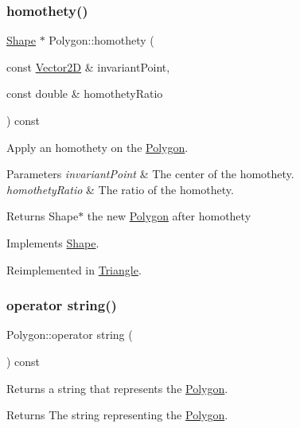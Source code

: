 \subsubsection{\texorpdfstring{homothety()}{homothety()}}
{\footnotesize\ttfamily \hyperlink{class_shape}{Shape} $\ast$ Polygon\+::homothety (\begin{DoxyParamCaption}\item[{const \hyperlink{class_vector2_d}{Vector2D} \&}]{invariant\+Point,  }\item[{const double \&}]{homothety\+Ratio }\end{DoxyParamCaption}) const\hspace{0.3cm}{\ttfamily [virtual]}}

Apply an homothety on the \hyperlink{class_polygon}{Polygon}. 
\begin{DoxyParams}{Parameters}
{\em invariant\+Point} & The center of the homothety. \\
\hline
{\em homothety\+Ratio} & The ratio of the homothety. \\
\hline
\end{DoxyParams}
\begin{DoxyReturn}{Returns}
Shape$\ast$ the new \hyperlink{class_polygon}{Polygon} after homothety 
\end{DoxyReturn}


Implements \hyperlink{class_shape_a91f18af3004ba210db5c91084c50beb9}{Shape}.



Reimplemented in \hyperlink{class_triangle_a45a3a9f74118c99b95c6d8e993773a71}{Triangle}.

\hypertarget{class_polygon_a41c29b75f2463646af0f7bd604a4853d}{}\label{class_polygon_a41c29b75f2463646af0f7bd604a4853d} 
\subsubsection{\texorpdfstring{operator string()}{operator string()}}
{\footnotesize\ttfamily Polygon\+::operator string (\begin{DoxyParamCaption}{ }\end{DoxyParamCaption}) const\hspace{0.3cm}{\ttfamily [virtual]}}

Returns a string that represents the \hyperlink{class_polygon}{Polygon}. \begin{DoxyReturn}{Returns}
The string representing the \hyperlink{class_polygon}{Polygon}. 
\end{DoxyReturn}


